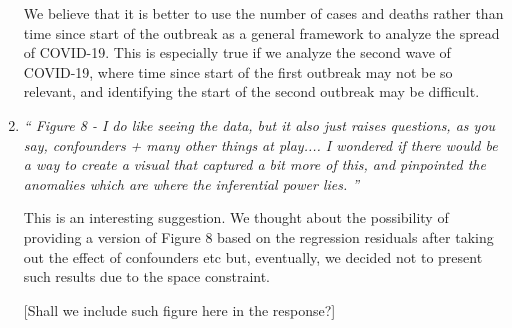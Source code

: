 \documentclass[11pt]{article}
\begin{document}
\begin{enumerate}
We believe that it is better to use the number of cases and deaths rather than time since start of the outbreak as a  general framework to analyze the spread of COVID-19. This is especially true if we analyze the second wave of COVID-19, where time since start of the first outbreak may not be so relevant, and identifying the start of the second outbreak may be difficult. 



\item \textit{`` Figure 8 - I do like seeing the data, but it also just raises questions, as you say, confounders + many other things at play.... I wondered if there would be a way to create a visual that captured a bit more of this, and pinpointed the anomalies which are where the inferential power lies. ''}

This is an interesting suggestion. We thought about the possibility of providing a version of Figure 8 based on the regression residuals after taking out the effect of confounders etc but, eventually, we decided not to present such results due to the space constraint.  

[Shall we include such figure here in the response?]

\end{enumerate}
\end{document}
